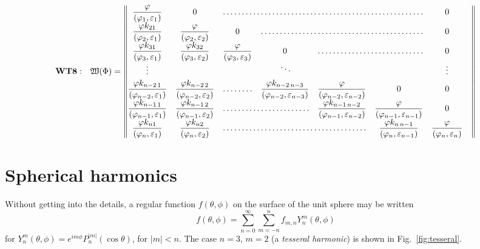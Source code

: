 \begin{widetext}[][b]
\begin{equation}\label{eqn:WT8}
\mathbf{WT8:}\quad
\mathfrak{W}(\bm{\Phi})= \begin{Vmatrix}
\dfrac\varphi{(\varphi_1,\varepsilon_1)}			& 0 												& \hdotsfor{4} 	& 0 			&	\\[\jot]
\dfrac{\varphi k_{21}}{(\varphi_2,\varepsilon_1)}	& \dfrac\varphi{(\varphi_2,\varepsilon_2)}			& 0 			& \hdotsfor{3} 	& 0 \\[\jot]
\dfrac{\varphi k_{31}}{(\varphi_3,\varepsilon_1)}	&\dfrac{\varphi k_{32}}{(\varphi_3,\varepsilon_2)}	& \dfrac\varphi{(\varphi_3,\varepsilon_3)}& 0 & \hdotsfor{2} & 0 \\[\jot]
\vdots 	&  &  & \smash{\rotatebox{15}{$\ddots$}} &  & & \vdots \\[\jot]
\dfrac{\varphi k_{n-2\, 1}}{(\varphi_{n-2},\varepsilon_1)}	&
\dfrac{\varphi k_{n-2\, 2}}{(\varphi_{n-2},\varepsilon_2)}	&\hdotsfor{1} & \dfrac{\varphi k_{n-2\,n-3}}{(\varphi_{n-2},\varepsilon_{n-3})} & \dfrac\varphi{(\varphi_{n-2},\varepsilon_{n-2})}& 0& 0 \\[\jot]
\dfrac{\varphi k_{n-1\, 1}}{(\varphi_{n-1},\varepsilon_1)}	& \dfrac{\varphi k_{n-1\, 2}}{(\varphi_{n-1},\varepsilon_2)} &\hdotsfor{2} & 
\dfrac{\varphi k_{n-1\,n-2}}{(\varphi_{n-1},\varepsilon_{n-2})}& \dfrac{\varphi}{(\varphi_{n-1},\varepsilon_{n-1})} & 0 \\[\jot]
\dfrac{\varphi k_{n1}}{(\varphi_n,\varepsilon_1)}	& \dfrac{\varphi k_{n2}}{(\varphi_n,\varepsilon_2)}	& \hdotsfor{3}	&
\dfrac{\varphi k_{n\,n-1}}{(\varphi_n,\varepsilon_{n-1})} & \dfrac{\varphi}{(\varphi_n,\varepsilon_n)}
\end{Vmatrix}
\end{equation}
\end{widetext}

\lipsum[55-56]

\appendix  
\section{Spherical harmonics\label{sec:sph-har}}

Without getting into the details, a regular function $f(\theta,\phi)$ on the surface of the unit sphere may be written
\begin{equation}
f(\theta,\phi) = \sum_{n=0}^\infty \sum_{m=-n}^n f_{m,n} Y_n^m(\theta,\phi)
\end{equation}
for $Y_n^m(\theta,\phi) = e^{i m\phi}P^{|m|}_n(\cos\theta)$, for $|m|<n$. The case $n=3$, $m=2$ (a \textit{tesseral harmonic}) is shown in Fig.~\ref{fig:tesseral}.

